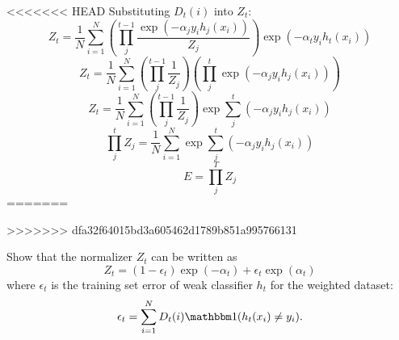 \begin{solution}
<<<<<<< HEAD
    Substituting $D_t(i)$ into $Z_t$:
    \begin{equation}
        Z_t = \frac{1}{N}\sum\limits_{i=1}^N \left(\prod_j^{t-1}\frac{\exp{(-\alpha_jy_ih_j(x_i))}}{Z_j}\right)\exp(-\alpha_{t}y_{i}h_{t}(x_{i}))
    \end{equation}
    \begin{equation}
        Z_t = \frac{1}{N}\sum\limits_{i=1}^N \left(\prod_j^{t-1}\frac{1}{Z_j}\right)\left(\prod_j^{t}\exp{(-\alpha_jy_ih_j(x_i))}\right)
    \end{equation}
    \begin{equation}
        Z_t = \frac{1}{N}\sum\limits_{i=1}^N \left(\prod_j^{t-1}\frac{1}{Z_j}\right)\exp{\sum_j^t\left(-\alpha_jy_ih_j(x_i)\right)}
    \end{equation}
    \begin{equation}
        \prod_j^{t}Z_j=\frac{1}{N}\sum\limits_{i=1}^N\exp{\sum_j^t\left(-\alpha_jy_ih_j(x_i)\right)}
    \end{equation}
    \begin{equation}
        E = \prod_j^{T}Z_j
    \end{equation}
=======

>>>>>>> dfa32f64015bd3a605462d1789b851a995766131
\end{solution}

\problem[5]
Show that the normalizer $Z_t$ can be written as
\[Z_t = (1 - \epsilon_t) \exp(-\alpha_t) + \epsilon_{t} \exp(\alpha_t)\]
where $\epsilon_t$ is the training set error of weak classifier $h_t$ for the weighted dataset:
\[\epsilon_t = \sum\limits_{i=1}^N D_t(i)\mathbbm1(h_t(x_i) \neq y_i).\]

